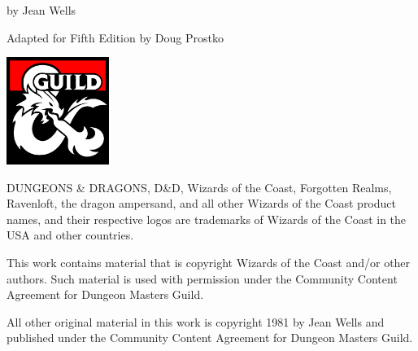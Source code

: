 \documentclass[10pt,twoside,twocolumn]{article}
\begin{document}
\begin{titlepage}
\begin{onecolumn}
\begin{center}
	\vspace{0.5cm}

	
	{\Large by Jean Wells}

	{\Large Adapted for Fifth Edition by Doug Prostko}
	
	\vspace{0.35cm}
	\includegraphics[width=0.25\textwidth]{img/dmsguild.jpg}
\end{center}

\begin{minipage}{0.94\textwidth}
{\footnotesize
	DUNGEONS \& DRAGONS, D\&D, Wizards of the Coast, Forgotten Realms,
	Ravenloft, the dragon ampersand, and all other Wizards of the Coast
	product names, and their respective logos are trademarks of Wizards
	of the Coast in the USA and other countries.
    
    This work contains material that is copyright Wizards of the Coast
    and/or other authors. Such material is used with permission under
    the Community Content Agreement for Dungeon Masters Guild.
    
    All other original material in this work is copyright 1981 by Jean
    Wells and published under the Community Content Agreement for
    Dungeon Masters Guild.
}

\end{minipage} \end{onecolumn} \end{titlepage} \clearpage

\setcounter{tocdepth}{2}
\begin{onecolumn}
    \tableofcontents
\end{onecolumn}







\printindex[monsters]
\printindex[magic]

\end{document}
